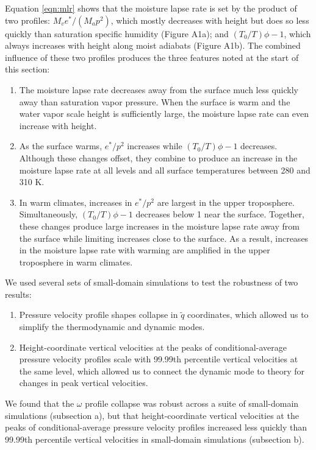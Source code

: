 \documentclass[twocol]{ametsoc}
\begin{document}
Equation \ref{eqn:mlr} shows that the moisture lapse rate is set by the product of two profiles: $M_v e^*/(M_a p^2)$, which mostly decreases with height but does so less quickly than saturation specific humidity (Figure A1a); and $(T_0/T)\phi - 1$, which always increases with height along moist adiabats (Figure A1b). The combined influence of these two profiles produces the three features noted at the start of this section:
\begin{enumerate}
    \item The moisture lapse rate decreases away from the surface much less quickly away than saturation vapor pressure. When the surface is warm and the water vapor scale height is sufficiently large, the moisture lapse rate can even increase with height.
    \item As the surface warms, $e^*/p^2$ increases while $(T_0/T)\phi - 1$ decreases. Although these changes offset, they combine to produce an increase in the moisture lapse rate at all levels and all surface temperatures between 280 and 310 K.
    \item In warm climates, increases in $e^*/p^2$ are largest in the upper troposphere. Simultaneously, $(T_0/T)\phi - 1$ decreases below 1 near the surface. Together, these changes produce large increases in the moisture lapse rate away from the surface while limiting increases close to the surface. As a result, increases in the moisture lapse rate with warming are amplified in the upper troposphere in warm climates.
\end{enumerate}

\appendix[B]
\label{app:small_domain_rce}

We used several sets of small-domain simulations to test the robustness of two results:
\begin{enumerate}
\item Pressure velocity profile shapes collapse in $\tilde{q}$ coordinates, which allowed us to simplify the thermodynamic and dynamic modes.
\item  Height-coordinate vertical velocities at the peaks of conditional-average pressure velocity profiles scale with 99.99th percentile vertical velocities at the same level, which allowed us to connect the dynamic mode to theory for changes in peak vertical velocities.
\end{enumerate}
We found that the $\omega$ profile collapse was robust across a suite of small-domain simulations (subsection a), but that height-coordinate vertical velocities at the peaks of conditional-average pressure velocity profiles increased less quickly than 99.99th percentile vertical velocities in small-domain simulations (subsection b).
\end{document}
